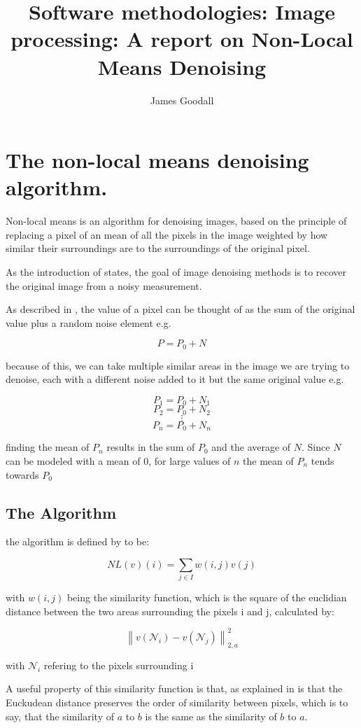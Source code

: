 \documentclass[11pt]{article}
\title{Software methodologies: Image processing: A report on Non-Local Means Denoising}
\author{James Goodall}
\begin{document}
\maketitle
\section{The non-local means denoising algorithm.}

Non-local means is an algorithm for denoising images, based on the principle of replacing a pixel of an mean of all the pixels in the image weighted by how similar their surroundings are to the surroundings of the original pixel. 

As the introduction of \cite{Buades} states, the goal of image denoising methods is to recover the original image from a noisy measurement.

As described in \cite{dip20}, the value of a pixel can be thought of as the sum of the original value plus a random noise element e.g.

\[P = P_0 + N\]

because of this, we can take multiple similar areas in the image we are trying to denoise, each with a different noise added to it but the same original value e.g.

\[P_1 = P_0 + N_1\]
\[P_2 = P_0 + N_2\]
\[\vdots\]
\[P_n = P_0 + N_n\]

finding the mean of $P_n$ results in the sum of $P_0$ and the average of $N$. Since $N$ can be modeled with a mean of $0$, for large values of $n$ the mean of $P_n$ tends towards $P_0$

\subsection{The Algorithm} \label{algorithm}

the algorithm is defined by \cite{Buades_2005} to be: 

\[NL(v)(i) = \sum_{j \in I}{w(i,j)v(j)}\]

with $w(i,j)$ being the similarity function, which is the square of the euclidian distance between the two areas surrounding the pixels i and j, calculated by:

\[\left\|v\left(\mathcal{N}_{i}\right)-v\left(\mathcal{N}_{j}\right)\right\|_{2, a}^{2}\]

with $\mathcal{N}_i$ refering to the pixels surrounding i

A useful property of this similarity function is that, as explained in \cite{Buades_2005} is that the Euckudean distance preserves the order of similarity between pixels, which is to say, that the similarity of $a$ to $b$ is the same as the similarity of $b$ to $a$.
\end{document}
